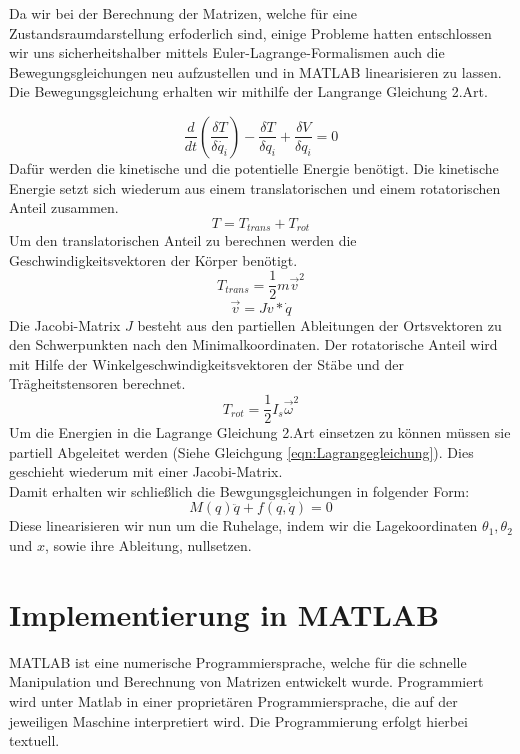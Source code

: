 \documentclass[a4paper, 10pt]{report}
\begin{document}
Da wir bei der Berechnung der Matrizen, welche für eine Zustandsraumdarstellung erfoderlich sind, einige Probleme hatten entschlossen wir uns sicherheitshalber mittels Euler-Lagrange-Formalismen auch die Bewegungsgleichungen neu aufzustellen und in MATLAB linearisieren zu lassen. Die Bewegungsgleichung erhalten wir mithilfe der Langrange Gleichung 2.Art.

\begin{equation}
\label{eqn:Lagrangegleichung}
\dfrac{d}{dt}(\dfrac{\delta T}{\delta \dot{q_{i}}})-\dfrac{\delta T}{\delta q_{i}}+\dfrac{\delta V}{\delta q_{i}}=0
\end{equation}
Dafür werden die kinetische und die potentielle Energie benötigt. Die kinetische Energie setzt sich wiederum aus einem translatorischen und einem rotatorischen Anteil zusammen.
\begin{equation}
T=T_{trans}+T_{rot} 
\end{equation}
Um den translatorischen Anteil zu berechnen werden die Geschwindigkeitsvektoren der Körper benötigt.
\begin{equation}
T_{trans}=\dfrac{1}{2} m \vec{v}^{2} 
\end{equation}
\begin{equation}
\vec{v}=Jv*\dot{q}
\end{equation}
Die Jacobi-Matrix $J$ besteht aus den partiellen Ableitungen der Ortsvektoren zu den Schwerpunkten nach den Minimalkoordinaten.
Der rotatorische Anteil wird mit Hilfe der Winkelgeschwindigkeitsvektoren der Stäbe und der Trägheitstensoren berechnet.
\begin{equation}
T_{rot}=\dfrac{1}{2} I_{s} \vec{\omega}^{2}
\end{equation}
Um die Energien in die Lagrange Gleichung 2.Art einsetzen zu können müssen sie partiell Abgeleitet werden (Siehe Gleichgung \ref{eqn:Lagrangegleichung}). Dies geschieht wiederum mit einer Jacobi-Matrix. \\
Damit erhalten wir schließlich die Bewgungsgleichungen in folgender Form:
\begin{equation}
M(q)\ddot{q} + f(q,\dot{q}) = 0
\end{equation}
Diese linearisieren wir nun um die Ruhelage, indem wir die Lagekoordinaten $\theta_{1}, \theta_{2}$ und $x$, sowie ihre Ableitung, nullsetzen.
\renewcommand{\thechapter}{}
\chapter{Implementierung in MATLAB}
\renewcommand{\thechapter}{3}
%
%
MATLAB ist eine numerische Programmiersprache, welche für die schnelle Manipulation und Berechnung von Matrizen entwickelt wurde. Programmiert wird unter Matlab in einer proprietären Programmiersprache, die auf der jeweiligen Maschine interpretiert wird. Die Programmierung erfolgt hierbei textuell.
\end{document}
